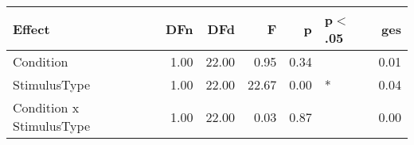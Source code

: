 \begin{table}[ht]
\centering
\begin{tabulary}{\textwidth}{lrrrrlr}
  \hline
Effect & DFn & DFd & F & p & p$<$.05 & ges \\ 
  \hline
Condition & 1.00 & 22.00 & 0.95 & 0.34 &  & 0.01 \\ 
  StimulusType & 1.00 & 22.00 & 22.67 & 0.00 & * & 0.04 \\ 
  Condition x StimulusType & 1.00 & 22.00 & 0.03 & 0.87 &  & 0.00 \\ 
   \hline
\end{tabulary}
\end{table}
